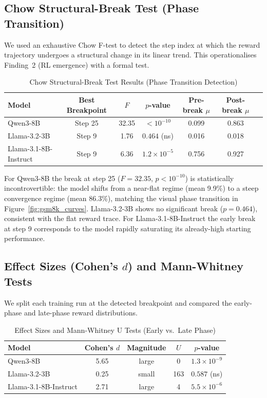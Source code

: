 \documentclass[12pt,a4paper]{report}
\theoremstyle{definition}
\begin{document}
\subsection{Chow Structural-Break Test (Phase Transition)}

We used an exhaustive Chow F-test to detect the step index at which the reward trajectory undergoes a structural change in its linear trend.  This operationalises Finding~2 (RL emergence) with a formal test.

\begin{table}[htbp]
\centering
\caption{Chow Structural-Break Test Results (Phase Transition Detection)}
\label{tab:chow}
\begin{tabular}{lcccccc}
\toprule
\textbf{Model} & \textbf{Best Breakpoint} & $F$ & $p$-value & Pre-break $\mu$ & Post-break $\mu$ \\
\midrule
Qwen3-8B              & Step 25 & 32.35 & $< 10^{-10}$ & 0.099 & 0.863 \\
Llama-3.2-3B          & Step 9  &  1.76 & $0.464$ (ns) & 0.016 & 0.018 \\
Llama-3.1-8B-Instruct & Step 9  &  6.36 & $1.2 \times 10^{-5}$ & 0.756 & 0.927 \\
\bottomrule
\end{tabular}
\end{table}

For Qwen3-8B the break at step 25 ($F = 32.35$, $p < 10^{-10}$) is statistically incontrovertible: the model shifts from a near-flat regime (mean 9.9\%) to a steep convergence regime (mean 86.3\%), matching the visual phase transition in Figure~\ref{fig:gsm8k_curves}.  Llama-3.2-3B shows no significant break ($p = 0.464$), consistent with the flat reward trace.  For Llama-3.1-8B-Instruct the early break at step 9 corresponds to the model rapidly saturating its already-high starting performance.

\subsection{Effect Sizes (Cohen's \texorpdfstring{$d$}{d}) and Mann-Whitney Tests}

We split each training run at the detected breakpoint and compared the early-phase and late-phase reward distributions.

\begin{table}[htbp]
\centering
\caption{Effect Sizes and Mann-Whitney U Tests (Early vs.\ Late Phase)}
\label{tab:cohen_mw}
\begin{tabular}{lcccc}
\toprule
\textbf{Model} & \textbf{Cohen's $d$} & \textbf{Magnitude} & $U$ & $p$-value \\
\midrule
Qwen3-8B              & 5.65 & large & 0   & $1.3 \times 10^{-9}$ \\
Llama-3.2-3B          & 0.25 & small & 163 & $0.587$ (ns) \\
Llama-3.1-8B-Instruct & 2.71 & large & 4   & $5.5 \times 10^{-6}$ \\
\bottomrule
\end{tabular}
\end{table}
\end{document}

